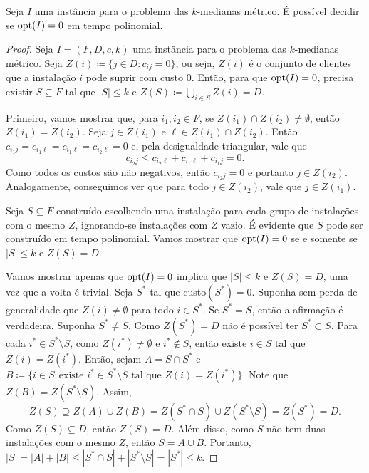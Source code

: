 \begin{lemma}
    Seja $I$ uma instância para o problema das $k$-medianas métrico. É possível decidir se $\mathrm{opt}(I) = 0$ em tempo polinomial.
\end{lemma}
\begin{proof}
    Seja $I = (F,D,c,k)$ uma instância para o problema das $k$-medianas métrico. Seja $Z(i) \coloneqq \{j \in D: c_{ij} = 0\}$, ou seja, $Z(i)$ é o conjunto de clientes que a instalação $i$ pode suprir com custo 0. Então, para que $\mathrm{opt}(I) = 0$, precisa existir $S \subseteq F$ tal que $|S|\leq k$ e $Z(S) \coloneqq \bigcup_{i \in S} Z(i) = D$.

    Primeiro, vamos mostrar que, para $i_1, i_2\in F $, se $Z(i_1) \cap Z(i_2) \neq \emptyset$, então $Z(i_1) = Z(i_2)$.  Seja $j \in Z(i_1)$ e $\ell \in Z(i_1) \cap Z(i_2)$. Então $c_{i_1j} = c_{i_1\ell} = c_{i_1\ell} = c_{i_2\ell} = 0$ e, pela desigualdade triangular, vale que
    \[c_{i_2j} \leq c_{i_2\ell} + c_{i_1\ell} + c_{i_1j} = 0.\]
    Como todos os custos são não negativos, então $c_{i_2j} = 0$ e portanto $j \in Z(i_2)$. Analogamente, conseguimos ver que para todo $j \in Z(i_2)$, vale que $j \in Z(i_1)$.

    Seja $S \subseteq F$ construído escolhendo uma instalação para cada grupo de instalações com o mesmo $Z$, ignorando-se instalações com $Z$ vazio. É evidente que $S$ pode ser construído em tempo polinomial. Vamos mostrar que $\mathrm{opt}(I) = 0$ se e somente se $|S| \leq k$ e $Z(S) = D$.

    Vamos mostrar apenas que $\mathrm{opt}(I) = 0$ implica que $|S|\leq k$ e $Z(S) = D$, uma vez que a volta é trivial. Seja $S^*$ tal que custo$(S^*) = 0$. Suponha sem perda de generalidade que $Z(i) \neq \emptyset$ para todo $i \in S^*$. Se $S^* = S$, então a afirmação é verdadeira. Suponha $S^* \neq S$. Como $Z(S^*)=D$ não é possível ter $S^* \subset S$. Para cada $i^* \in S^* \setminus S$, como $Z(i^*) \neq \emptyset$ e $i^* \not \in S$, então existe $i \in S$ tal que $Z(i) = Z(i^*)$. Então, sejam $A = S \cap S^*$ e $B \coloneqq \{i \in S: \text{existe } i^* \in S^* \setminus S \text{ tal que } Z(i) = Z(i^*)\}$. Note que $Z(B) = Z(S^*\setminus S)$. Assim,
    \[Z(S) \supseteq Z(A) \cup Z(B) = Z(S^* \cap S) \cup Z(S^*\setminus S) = Z(S^*) = D.\]
    Como $Z(S) \subseteq D$, então $Z(S) = D$. Além disso, como $S$ não tem duas instalações com o mesmo $Z$, então $S = A \cup B$. Portanto, $|S| = |A| + |B| \leq |S^* \cap S| + |S^* \setminus S| = |S^*| \leq k$.
\end{proof} 

